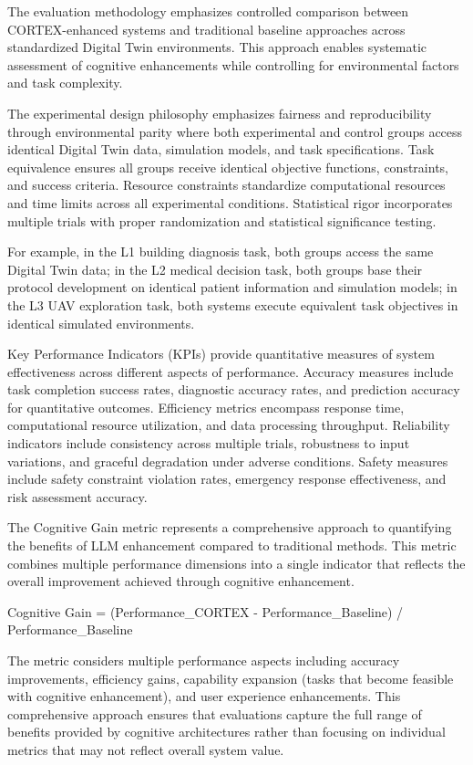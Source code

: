The evaluation methodology emphasizes controlled comparison between CORTEX-enhanced systems and traditional baseline approaches across standardized Digital Twin environments. This approach enables systematic assessment of cognitive enhancements while controlling for environmental factors and task complexity.

The experimental design philosophy emphasizes fairness and reproducibility through environmental parity where both experimental and control groups access identical Digital Twin data, simulation models, and task specifications. Task equivalence ensures all groups receive identical objective functions, constraints, and success criteria. Resource constraints standardize computational resources and time limits across all experimental conditions. Statistical rigor incorporates multiple trials with proper randomization and statistical significance testing.

For example, in the L1 building diagnosis task, both groups access the same Digital Twin data; in the L2 medical decision task, both groups base their protocol development on identical patient information and simulation models; in the L3 UAV exploration task, both systems execute equivalent task objectives in identical simulated environments.

Key Performance Indicators (KPIs) provide quantitative measures of system effectiveness across different aspects of performance. Accuracy measures include task completion success rates, diagnostic accuracy rates, and prediction accuracy for quantitative outcomes. Efficiency metrics encompass response time, computational resource utilization, and data processing throughput. Reliability indicators include consistency across multiple trials, robustness to input variations, and graceful degradation under adverse conditions. Safety measures include safety constraint violation rates, emergency response effectiveness, and risk assessment accuracy.

The Cognitive Gain metric represents a comprehensive approach to quantifying the benefits of LLM enhancement compared to traditional methods. This metric combines multiple performance dimensions into a single indicator that reflects the overall improvement achieved through cognitive enhancement.

Cognitive Gain = (Performance_CORTEX - Performance_Baseline) / Performance_Baseline

The metric considers multiple performance aspects including accuracy improvements, efficiency gains, capability expansion (tasks that become feasible with cognitive enhancement), and user experience enhancements. This comprehensive approach ensures that evaluations capture the full range of benefits provided by cognitive architectures rather than focusing on individual metrics that may not reflect overall system value.


